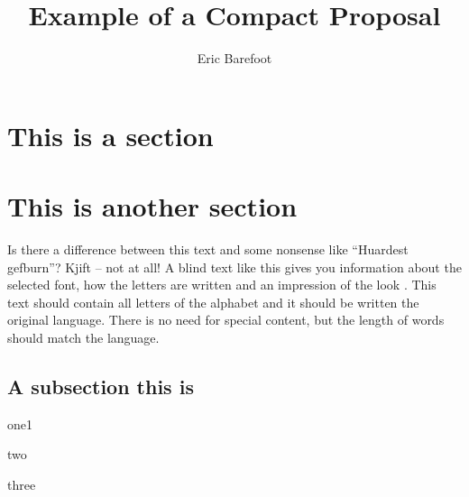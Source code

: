 \documentclass[final]{compact_proposal}
\title{Example of a Compact Proposal}
\author{Eric Barefoot}
\begin{document}
 
\maketitle


\section{This is a section}
\blindtext[4]


\section{This is another section}
Is there a difference between this text and some nonsense like ``Huardest gefburn''? Kjift – not at all! 
A blind text like this gives you information about the  selected font, how the letters are written and an impression of the look \cnote.
This text should contain all letters of the alphabet and it should be written  the original language. 
There is no \pnote need for special content, but the length of words  should match the language. 

\subsection{A subsection this is}
\blindtext[1]
\begin{tightitemize}
    \item one1
    \item two
    \item three
\end{tightitemize}
\blindtext[4]
\end{document}
